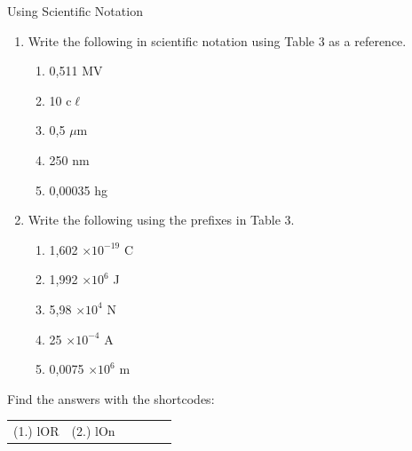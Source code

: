 \begin{exercises}{Using Scientific Notation }
            \nopagebreak
      \label{m30853*id66490}\begin{enumerate}[noitemsep, label=\textbf{\arabic*}. ] 
            \label{m30853*uid39}\item Write the following in scientific notation using Table 3 as a reference.
\label{m30853*id66510}\begin{enumerate}[noitemsep, label=\textbf{\alph*}. ] 
            \label{m30853*uid40}\item 0,511 MV
\label{m30853*uid41}\item 10 c$\ell $\label{m30853*uid42}\item 0,5 $\mu $m
\label{m30853*uid43}\item 250 nm
\label{m30853*uid44}\item 0,00035 hg
\end{enumerate}
                \label{m30853*uid45}\item Write the following using the prefixes in Table 3.
\label{m30853*id66609}\begin{enumerate}[noitemsep, label=\textbf{\alph*}. ] 
            \label{m30853*uid46}\item 1,602 $\ensuremath{\times}{10}^{-19}$ C
\label{m30853*uid47}\item 1,992 $\ensuremath{\times}{10}^{6}$ J
\label{m30853*uid48}\item 5,98 $\ensuremath{\times}{10}^{4}$ N
\label{m30853*uid49}\item 25 $\ensuremath{\times}{10}^{-4}$ A
\label{m30853*uid50}\item 0,0075 $\ensuremath{\times}{10}^{6}$ m
\end{enumerate}
                \end{enumerate}
\par {} Find the answers with the shortcodes:
 \par \begin{tabular}[h]{cccccc}
 (1.) lOR  &  (2.) lOn  & \end{tabular}
\end{exercises}
